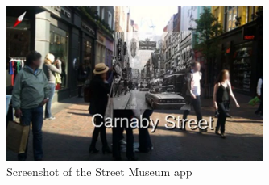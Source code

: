 \begin{figure}[h!]
    \centering
    \includegraphics[width=0.75\textwidth]{figures/Streetmuseum.png}
    \caption{Screenshot of the Street Museum app \cite{Brothers}}\label{fig:streetmuseum}
\end{figure}



